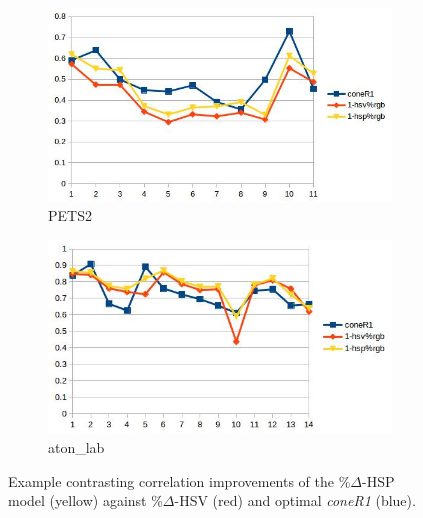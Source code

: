 \documentclass[12pt]{report}
\begin{document}
\begin{figure}
\centering
\begin{subfigure}{.49\linewidth}
  \includegraphics[width=1\linewidth]{figures/brightness/rgb/pets2_hsv_hsp.jpg}
  \caption{PETS2}
\end{subfigure}
\hfill
\begin{subfigure}{.49\linewidth}
  \includegraphics[width=1\linewidth]{figures/brightness/rgb/lab_hsv_hsp.jpg}
  \caption{aton\_lab}
\end{subfigure}

\caption{Example contrasting correlation improvements of the \%$\Delta$-HSP model (yellow) against \%$\Delta$-HSV (red) and optimal \textit{coneR1} (blue). }
\label{fig:brightness_example}
\end{figure}
\end{document}
